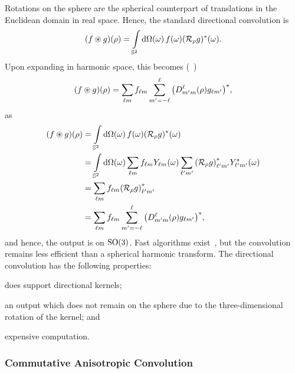 Rotations on the sphere are the spherical counterpart of translations in the Euclidean domain in real space.
Hence, the standard directional convolution is
%
\begin{equation}\label{eq:chapter2_directional_convolution}
	(f \circledast g)(\rho)
	= \integrateSphere{\omega} \pixel{f} \pixel{\conj{(\rotation{\rho}g)}}.
\end{equation}
%
Upon expanding in harmonic space, this becomes (\eg{}~\autocite{McEwen2007,Wandelt2001})
%
\begin{equation}
	(f \circledast g) (\rho)
	= \harmonicSum \harmonic{f} \sum\limits_{m'=-\ell}^{\ell} \conj{\big(\wigner{\ell}{m'}{m}(\rho) g_{\ell m'}\big)},
\end{equation}
%
as
%
\begin{align}
	(f \circledast g)(\rho)
	 & = \integrateSphere{\omega} \pixel{f} \pixel{\conj{(\rotation{\rho}g)}} \nonumber{}                                                                                           \\
	 & = \integrateSphere{\omega} \harmonicSum \harmonic{f} \pixel{\harmonic{Y}} \harmonicSum['] \conj{\harmonic[']{(\rotation{\rho}g)}} \pixel{\conj{\harmonic[']{Y}}} \nonumber{} \\
	 & = \harmonicSum \harmonic{f} \conj{\harmonic[']{(\rotation{\rho}g)}} \nonumber{}                                                                                              \\
	 & = \harmonicSum \harmonic{f} \sum\limits_{m'=-\ell}^{\ell} \conj{\big(\wigner{\ell}{m'}{m}(\rho) g_{\ell m'}\big)},
\end{align}
%
and hence, the output is on \(\rotationGroup{}\).
Fast algorithms exist~\autocite{McEwen2007,Wandelt2001,Wiaux2007,McEwen2013}, but the convolution remains less efficient than a spherical harmonic transform.
The directional convolution has the following properties:
%
\begin{inparaenum}[(i)]
	\item does support directional kernels;
	\item an output which does not remain on the sphere due to the three-dimensional rotation of the kernel; and
	\item expensive computation.
\end{inparaenum}

\subsubsection{Commutative Anisotropic Convolution}

